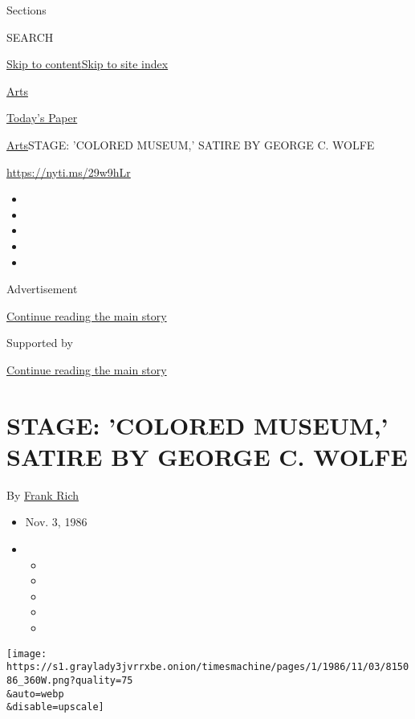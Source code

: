 Sections

SEARCH

\protect\hyperlink{site-content}{Skip to
content}\protect\hyperlink{site-index}{Skip to site index}

\href{https://www.nytimes3xbfgragh.onion/section/arts}{Arts}

\href{https://myaccount.nytimes3xbfgragh.onion/auth/login?response_type=cookie\&client_id=vi}{}

\href{https://www.nytimes3xbfgragh.onion/section/todayspaper}{Today's
Paper}

\href{/section/arts}{Arts}\textbar{}STAGE: 'COLORED MUSEUM,' SATIRE BY
GEORGE C. WOLFE

\url{https://nyti.ms/29w9hLr}

\begin{itemize}
\item
\item
\item
\item
\item
\end{itemize}

Advertisement

\protect\hyperlink{after-top}{Continue reading the main story}

Supported by

\protect\hyperlink{after-sponsor}{Continue reading the main story}

\hypertarget{stage-colored-museum-satire-by-george-c-wolfe}{%
\section{STAGE: 'COLORED MUSEUM,' SATIRE BY GEORGE C.
WOLFE}\label{stage-colored-museum-satire-by-george-c-wolfe}}

By \href{https://www.nytimes3xbfgragh.onion/by/frank-rich}{Frank Rich}

\begin{itemize}
\item
  Nov. 3, 1986
\item
  \begin{itemize}
  \item
  \item
  \item
  \item
  \item
  \end{itemize}
\end{itemize}

\texttt{[image: https://s1.graylady3jvrrxbe.onion/timesmachine/pages/1/1986/11/03/815086\_360W.png?quality=75\\\&auto=webp\\\&disable=upscale]}

